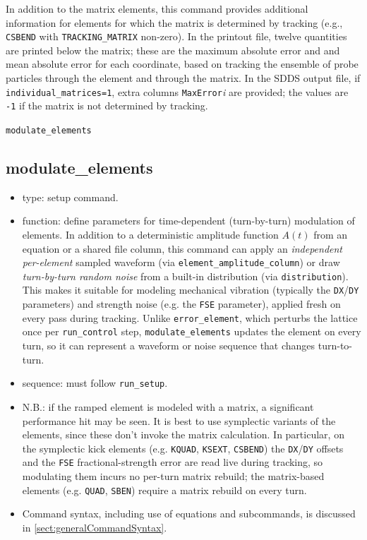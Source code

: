 \documentclass[11pt]{article}
\begin{document}
In addition to the matrix elements, this command provides additional information for elements for which the
matrix is determined by tracking (e.g., \verb|CSBEND| with \verb|TRACKING_MATRIX| non-zero).
In the printout file, twelve quantities are printed below the matrix; these are the maximum absolute error and
and mean absolute error for each coordinate, based on tracking the ensemble of probe particles through the
element and through the matrix.
In the SDDS output file, if \verb|individual_matrices=1|, extra columns \verb|MaxError|{\em i} are provided;
the values are \verb|-1| if the matrix is not determined by tracking.

\newpage
\begin{center}{\Large\verb|modulate_elements|}\end{center}
\subsection{modulate\_elements\label{subsec:modulateelements}}

\begin{itemize}
\item type: setup command.
\item function: define parameters for time-dependent (turn-by-turn) modulation of elements.
  In addition to a deterministic amplitude function $A(t)$ from an equation or a shared file column,
  this command can apply an {\em independent per-element} sampled waveform (via
  \verb|element_amplitude_column|) or draw {\em turn-by-turn random noise} from a built-in
  distribution (via \verb|distribution|).  This makes it suitable for modeling mechanical vibration
  (typically the \verb|DX|/\verb|DY| parameters) and strength noise (e.g. the \verb|FSE| parameter),
  applied fresh on every pass during tracking.  Unlike \verb|error_element|, which perturbs the
  lattice once per \verb|run_control| step, \verb|modulate_elements| updates the element on every
  turn, so it can represent a waveform or noise sequence that changes turn-to-turn.
\item sequence: must follow \verb|run_setup|.
\item N.B.: if the ramped element is modeled with a matrix, a significant performance hit may be seen.
  It is best to use symplectic variants of the elements, since these don't invoke the matrix calculation.
  In particular, on the symplectic kick elements (e.g. \verb|KQUAD|, \verb|KSEXT|, \verb|CSBEND|)
  the \verb|DX|/\verb|DY| offsets and the \verb|FSE| fractional-strength error are read live during
  tracking, so modulating them incurs no per-turn matrix rebuild; the matrix-based elements
  (e.g. \verb|QUAD|, \verb|SBEN|) require a matrix rebuild on every turn.
\item Command syntax, including use of equations and subcommands, is discussed in \ref{sect:generalCommandSyntax}.
\end{itemize}
\end{document}
